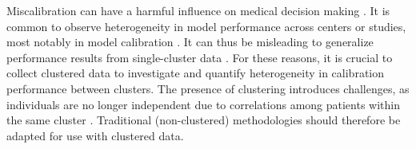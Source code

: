 Miscalibration can have a harmful influence on medical decision making \cite{vancalsterCalibrationRiskPrediction2015}. It is common to observe heterogeneity in model performance across centers or studies, most notably in model calibration \cite{vancalsterValidationModelsDiagnose2020,guptaDevelopmentValidationISARIC2021,steyerbergAssessmentHeterogeneityIndividual2019,vanAmsterdamCausalViewpoint2024}. It can thus be misleading to generalize performance results from single-cluster data \cite{wynantsDoesIgnoringClustering2018,debrayFrameworkDevelopingImplementing2013,dejongDevelopingMoreGeneralizable2021,moherGuidanceDevelopersHealth2010}. For these reasons, it is crucial to collect clustered data to investigate and quantify heterogeneity in calibration performance between clusters. The presence of clustering introduces challenges, as individuals are no longer independent due to correlations among patients within the same cluster \cite{snijdersMultilevelAnalysisIntroduction2012,finchMultilevelModelingUsing2019a}. Traditional (non-clustered) methodologies should therefore be adapted for use with clustered data.

